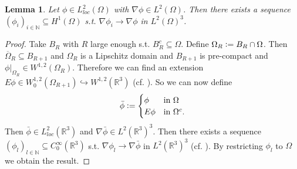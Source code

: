 \documentclass[12pt,a4paper]{article}
\numberwithin{equation}{subsection}
\newtheorem{lemma}{Lemma}[section]
\numberwithin{lemma}{subsection}
\theoremstyle{definition}
\newcommand{\naturalnum}{\mathbb{N}}
\newcommand{\real}{\mathbb{R}}
\begin{document}
\begin{lemma}\label{lem:gradient_sequence}
    Let $\phi \in L^2_{loc}(\Omega)$ with $\nabla \phi \in L^2(\Omega)$. Then 
    there exists a sequence $(\phi_i)_{i \in \naturalnum} \subseteq H^1(\Omega)$
    s.t. $\nabla \phi_i \rightarrow \nabla \phi$ in $L^2(\Omega)^3$.
\end{lemma}
\begin{proof}
    Take $B_R$ with $R$ large enough s.t. $B_R^c \subseteq \Omega$. 
    Define $\Omega_R \vcentcolon= B_R \cap \Omega$. Then 
    $\overline{\Omega}_R \subseteq B_{R+1}$ and $\Omega_R$ is a Lipschitz 
    domain and $B_{R+1}$ is pre-compact and
    $\phi|_{\Omega_R} \in W^{1,2}(\Omega_R)$. Therefore we can find an extension
    $E\phi \in W_0^{1,2}(\Omega_{R+1}) \hookrightarrow W^{1,2}(\mathbb{R}^3)$
    (cf. \cite[Sec.\,1.5.1]{mazya}). So we can now define
    \begin{align*}
    \bar{\phi} \vcentcolon=
    \begin{cases}
        \phi & \mbox{in $\Omega$}\\
        E\phi & \mbox{in $\Omega^c$.}\\
    \end{cases}
    \end{align*}
    Then $\bar{\phi} \in L^2_{loc}(\real^3)$ and 
    $\nabla \bar{\phi} \in L^2(\real^3)^3$. 
    Then there exists a sequence 
    $(\phi_l) _{l \in \naturalnum} \subseteq C^\infty_0(\real^3)$ s.t.
    $\nabla \phi_l \rightarrow \nabla \bar{\phi}$ in $L^2(\real^3)^3$ 
    (cf. \cite[Lemma 1.1]{simader}). By restricting $\phi_l$ to $\Omega$ 
    we obtain the result.
\end{proof}
\end{document}
